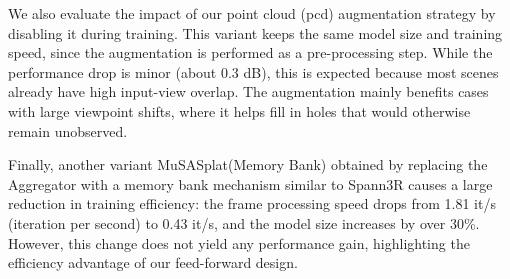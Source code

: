\documentclass[letterpaper]{article} %
\begin{document}
We also evaluate the impact of our point cloud (pcd) augmentation strategy by disabling it during training. This variant keeps the same model size and training speed, since the augmentation is performed as a pre-processing step. While the performance drop is minor (about 0.3 dB), this is expected because most scenes already have high input-view overlap. The augmentation mainly benefits cases with large viewpoint shifts, where it helps fill in holes that would otherwise remain unobserved.

Finally, another variant MuSASplat(Memory Bank) obtained by replacing the Aggregator with a memory bank mechanism similar to Spann3R causes a large reduction in training efficiency: the frame processing speed drops from 1.81 it/s (iteration per second) to 0.43 it/s, and the model size increases by over 30\%. However, this change does not yield any performance gain, highlighting the efficiency advantage of our feed-forward design.
\end{document}
